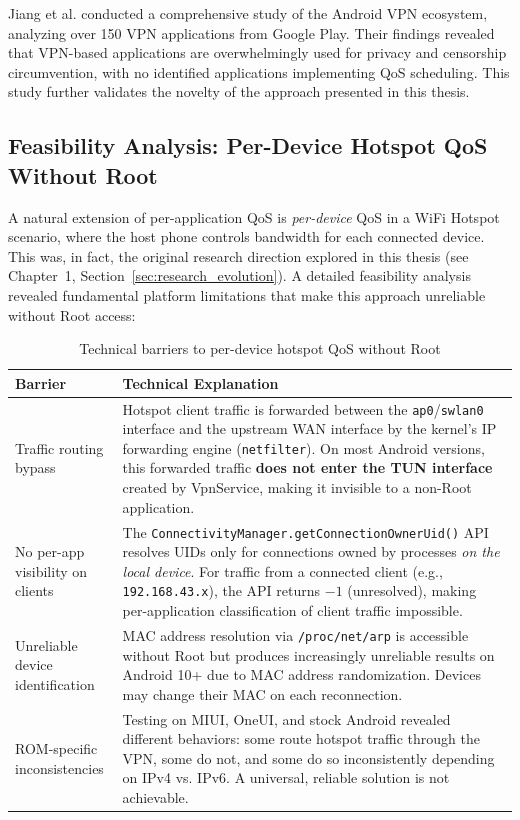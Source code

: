 Jiang et al. \cite{jiang2021android} conducted a comprehensive study of the Android VPN ecosystem, analyzing over 150 VPN applications from Google Play. Their findings revealed that VPN-based applications are overwhelmingly used for privacy and censorship circumvention, with no identified applications implementing QoS scheduling. This study further validates the novelty of the approach presented in this thesis.

\subsection{Feasibility Analysis: Per-Device Hotspot QoS Without Root}
\label{sec:hotspot_feasibility}

A natural extension of per-application QoS is \textit{per-device} QoS in a WiFi Hotspot scenario, where the host phone controls bandwidth for each connected device. This was, in fact, the original research direction explored in this thesis (see Chapter~1, Section~\ref{sec:research_evolution}). A detailed feasibility analysis revealed fundamental platform limitations that make this approach unreliable without Root access:

\begin{table}[H]
\centering
\caption{Technical barriers to per-device hotspot QoS without Root}
\label{tab:hotspot_barriers}
\begin{tabular}{@{}p{3.5cm}p{9.5cm}@{}}
\toprule
\textbf{Barrier} & \textbf{Technical Explanation} \\
\midrule
Traffic routing bypass &
Hotspot client traffic is forwarded between the \texttt{ap0}/\texttt{swlan0} interface and the upstream WAN interface by the kernel's IP forwarding engine (\texttt{netfilter}). On most Android versions, this forwarded traffic \textbf{does not enter the TUN interface} created by VpnService, making it invisible to a non-Root application. \\
\addlinespace
No per-app visibility on clients &
The \texttt{ConnectivityManager.getConnectionOwnerUid()} API resolves UIDs only for connections owned by processes \textit{on the local device}. For traffic from a connected client (e.g., \texttt{192.168.43.x}), the API returns $-1$ (unresolved), making per-application classification of client traffic impossible. \\
\addlinespace
Unreliable device identification &
MAC address resolution via \texttt{/proc/net/arp} is accessible without Root but produces increasingly unreliable results on Android 10+ due to MAC address randomization. Devices may change their MAC on each reconnection. \\
\addlinespace
ROM-specific inconsistencies &
Testing on MIUI, OneUI, and stock Android revealed different behaviors: some route hotspot traffic through the VPN, some do not, and some do so inconsistently depending on IPv4 vs. IPv6. A universal, reliable solution is not achievable. \\
\bottomrule
\end{tabular}
\end{table}

